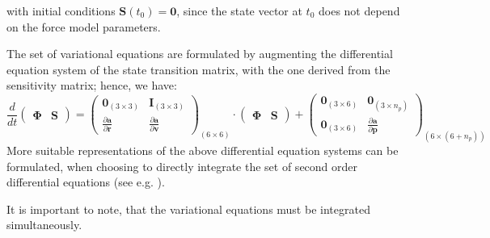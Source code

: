 with initial conditions $\bm{S}(t_0) = \bm{0}$, since the state vector at $t_0$ 
does not depend on the force model parameters.

The set of variational equations are formulated by augmenting the differential 
equation system of the state transition matrix, with the one derived from the 
sensitivity matrix; hence, we have:
\begin{equation}
  \frac{d}{dt} \begin{pmatrix} \bm{\Phi} & \bm{S} \end{pmatrix} = 
  \begin{pmatrix}
      \bm{0}_{(3 \times 3)} & \bm{I}_{(3 \times 3)} \\
      \frac{\partial \bm{a}}{\partial \bm{r}} & \frac{\partial \bm{a}}{\partial \bm{v}} 
  \end{pmatrix}_{(6 \times 6)}
  \cdot \begin{pmatrix} \bm{\Phi} & \bm{S} \end{pmatrix} + 
  \begin{pmatrix}
      \bm{0}_{(3 \times 6)} & \bm{0}_{(3 \times n_p)} \\
      \bm{0}_{(3 \times 6)} & \frac{\partial \bm{a}}{\partial \bm{p}} 
  \end{pmatrix}_{(6 \times (6+n_p))}
\end{equation}
More suitable representations of the above differential equation systems can be 
formulated, when choosing to directly integrate the set of second order 
differential equations (see e.g. \cite{Montenbruck2000}).

It is important to note, that the variational equations must be integrated 
simultaneously. 
